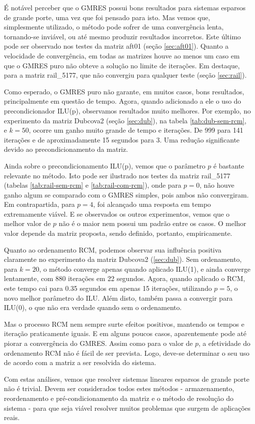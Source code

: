 \documentclass[
	11pt,				%
	oneside,			%
	a4paper,			%
	english,			%
	brazil,				%
	]{article}
\begin{document}
É notável perceber que o GMRES possui bons resultados para sistemas esparsos de grande porte, uma vez que foi pensado para isto. Mas vemos que, simplesmente utilizado, o método pode sofrer de uma convergência lenta, tornando-se inviável, ou até mesmo produzir resultados incorretos. Este último pode ser observado nos testes da matriz aft01 (seção \ref{sec:aft01}). Quanto a velocidade de convergência, em todas as matrizes houve ao menos um caso em que o GMRES puro não obteve a solução no limite de iterações. Em destaque, para a matriz rail\_5177, que não convergiu para qualquer teste (seção \ref{sec:rail}).

Como esperado, o GMRES puro não garante, em muitos casos, bons resultados, principalmente em questão de tempo. Agora, quando adicionado a ele o uso do precondicionador ILU(p), observamos resultados muito melhores. Por exemplo, no experimento da matriz Dubcova2 (seção \ref{sec:dub}), na tabela \ref{tab:dub-sem-rcm}, e $ k = 50 $, ocorre um ganho muito grande de tempo e iterações. De 999 para 141 iterações e de aproximadamente 15 segundos para 3. Uma redução significante devido ao precondicionamento da matriz.

Ainda sobre o precondicionamento ILU(p), vemos que o parâmetro $ p $ é bastante relevante no método. Isto pode ser ilustrado nos testes da matriz rail\_5177 (tabelas \ref{tab:rail-sem-rcm} e \ref{tab:rail-com-rcm}), onde para $ p = 0 $, não houve ganho algum se comparado com o GMRES simples, pois ambos não convergiram. Em contrapartida, para $ p = 4 $, foi alcançado uma resposta em tempo extremamente viável. E se observados os outros experimentos, vemos que o melhor valor de $ p $ não é o maior nem possui um padrão entre os casos. O melhor valor depende da matriz proposta, sendo definido, portanto, empiricamente.

Quanto ao ordenamento RCM, podemos observar sua influência positiva claramente no experimento da matriz Dubcova2 (\ref{sec:dub}). Sem ordenamento, para $ k = 20 $, o método converge apenas quando aplicado ILU(1), e ainda converge lentamente, com 880 iterações em 22 segundos. Agora, quando aplicado o RCM, este tempo cai para 0.35 segundos em apenas 15 iterações, utilizando $ p = 5 $, o novo melhor parâmetro do ILU. Além disto, também passa a convergir para ILU(0), o que não era verdade quando sem o ordenamento. 

Mas o processo RCM nem sempre surte efeitos positivos, mantendo os tempos e iteração praticamente iguais. E em alguns poucos casos, aparentemente pode até piorar a convergência do GMRES. Assim como para o valor de $ p $, a efetividade do ordenamento RCM não é fácil de ser prevista. Logo, deve-se determinar o seu uso de acordo com a matriz a ser resolvida do sistema.

Com estas análises, vemos que resolver sistemas lineares esparsos de grande porte não é trivial. Devem ser considerados todos estes métodos - armazenamento, reordenamento e pré-condicionamento da matriz e o método de resolução do sistema - para que seja viável resolver muitos problemas que surgem de aplicações reais.
\end{document}
